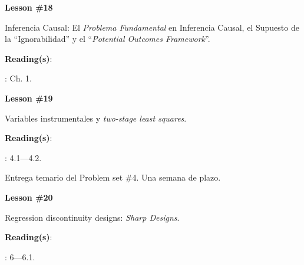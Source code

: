 \documentclass[letterpaper]{article}
\renewenvironment{itemize}{
  \begin{list}{}{
    \setlength{\leftmargin}{1.5em}
  }
}{
  \end{list}
}
\begin{document}
\begin{enumerate}
  \item {}


      \begin{itemize} 
        \item[$\bullet$] {\bf Lesson \#18}
          \begin{itemize} 
            \item[$\circ$] Inferencia Causal: El \emph{Problema Fundamental} en Inferencia Causal, el Supuesto de la ``Ignorabilidad'' y el ``\emph{Potential Outcomes Framework}''.
            \item[$\circ$] {\bf Reading(s)}: 
              \begin{itemize}
                \item[$\diamond$] \textcite{Imbens2015}: Ch. 1.
              \end{itemize}
          \end{itemize}
      \end{itemize}





      \begin{itemize} 
        \item[$\bullet$] {\bf Lesson \#19}
          \begin{itemize} 
            \item[$\circ$] Variables instrumentales y \emph{two-stage least squares}.
            \item[$\circ$] {\bf Reading(s)}: 
              \begin{itemize}
                \item[$\diamond$] \textcite{Angrist2009}: 4.1---4.2.
              \end{itemize}
          \end{itemize}
      \end{itemize}


\item[{\color{red}\Pointinghand}] Entrega temario del Problem set \#4. Una semana de plazo.


      \begin{itemize} 
        \item[$\bullet$] {\bf Lesson \#20}
          \begin{itemize} 
            \item[$\circ$] Regression discontinuity designs: \emph{Sharp Designs}.
            \item[$\circ$] {\bf Reading(s)}: 
              \begin{itemize}
                \item[$\diamond$] \textcite{Angrist2009}: 6---6.1.
              \end{itemize}
          \end{itemize}
      \end{itemize}



\end{enumerate}
\end{document}
